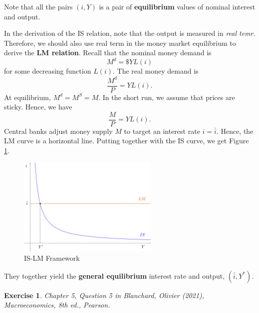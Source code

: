 \documentclass[12pt]{article}
\newtheorem{exercise}{Exercise}
\begin{document}
Note that all the pairs $(i, Y)$ is a pair of \textbf{equilibrium} values of nominal interest and output.

In the derivation of the IS relation, note that the output is measured in \textit{real temr}. Therefore, we should also use real term in the money market equilibrium to derive the \textbf{LM relation}. Recall that the nominal money demand is
\[M^d = \$ Y L(i)\]
for some decreasing function $L(i)$. The real money demand is
\[\frac{M^d}{P} = Y L(i).\]
At equilibrium, $M^d = M^S = M$. In the short run, we assume that prices are sticky. Hence, we have
\[ \frac{M}{P} = Y L(i).\]
Central banks adjust money supply $M$ to target an interest rate $i = \bar{i}$. Hence, the LM curve is a horizontal line. Putting together with the IS curve, we get Figure \ref{fig:is-lm}.

\begin{figure}[htp]
    \centering
    \includegraphics[width=0.6\textwidth]{is-lm.png}
    \caption{IS-LM Framework}
    \label{fig:is-lm}
\end{figure}

They together yield the \textbf{general equilibrium} interest rate and output, $(\bar{i}, Y^*)$.

\begin{exercise}
    Chapter 5, Question 5 in Blanchard, Olivier (2021), \textit{Macroeconomics}, 8th ed., Pearson.
\end{exercise}
\end{document}
